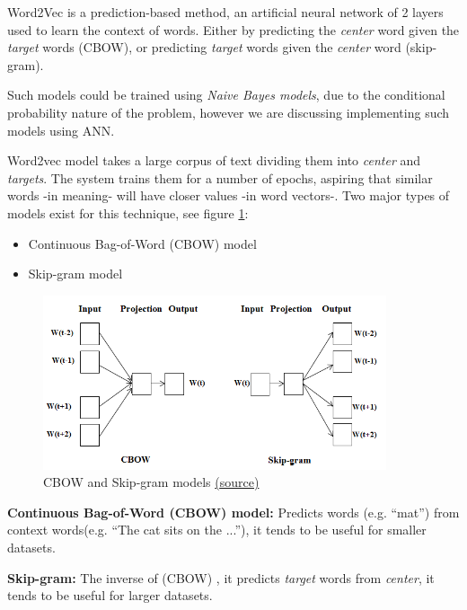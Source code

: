 Word2Vec is a prediction-based method, an artificial neural network of 2 layers used to learn the context of words. 
Either by predicting the \textit{center} word given the \textit{target} words (CBOW), or predicting \textit{target} words given the \textit{center} word (skip-gram).

Such models could be trained using \emph{Naive Bayes models}, due to the conditional probability nature of the problem, however we are discussing implementing such models using ANN.

Word2vec model takes a large corpus of text dividing them into \textit{center} and \textit{targets}. The system trains them for a number of epochs, aspiring that similar words -in meaning- will have closer values -in word vectors-. Two major types of models exist for this technique, see figure \ref{fig:word2vec_1}:

\begin{itemize}
  \item Continuous Bag-of-Word (CBOW) model
  \item Skip-gram model
\end{itemize}

\begin{figure}[h]
    \centering
    \includegraphics[width=0.9\textwidth]{images/CBOW-and-Skip-gram-models-architecture-1.png}
    \caption{CBOW and Skip-gram models \href{https://www.researchgate.net/profile/Nailah-Al-Madi/publication/319954363/figure/fig1/AS:552189871353858@1508663732919/CBOW-and-Skip-gram-models-architecture-1.png}{(\underline{source})}}
    \label{fig:word2vec_1}
\end{figure}

\textbf{Continuous Bag-of-Word (CBOW) model: }Predicts words (e.g. “mat”) from context words(e.g. “The cat sits on the ...”), it tends to be useful for smaller datasets. \newline

\textbf{Skip-gram: }The inverse of (CBOW) \cite{skip_gram}, it predicts \textit{target} words from \textit{center}, it tends to be useful for larger datasets. \newline




